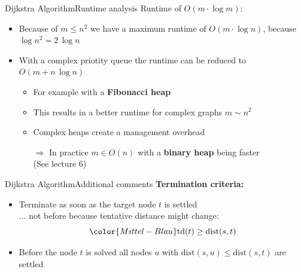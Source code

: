 \begin{frame}{Dijkstra Algorithm}{Runtime analysis}
  Runtime of {\color{Mittel-Blau}$O(m \cdot \log m)$}:
  \begin{itemize}
    \item
      Because of {\color{Mittel-Blau}$m \leq n^2$} we have a maximum runtime of
      {\color{Mittel-Blau}$O(m \cdot \log n)$}, because
      {\color{Mittel-Blau}$\log n^2 = 2 \, \log n$}
    \item
      With a complex {\color{Mittel-Blau}priotity queue} the runtime can be
      reduced to {\color{Mittel-Blau}$O(m + n \, \log n)$}
      \begin{itemize}
        \item
          For example with a \textbf{Fibonacci heap}
        \item
          This results in a better runtime for complex graphs
          {\color{Mittel-Blau}$m \sim n^2$}
        \item
          Complex heaps create a management overhead
        \item[$\Rightarrow$]
          In practice {\color{Mittel-Blau}$m \in O(n)$} with a
          \textbf{binary heap} being faster\\
          {\color{gray}(See lecture 6)}
      \end{itemize}
  \end{itemize}
\end{frame}


\begin{frame}{Dijkstra Algorithm}{Additional comments}
  \textbf{Termination criteria:}
  \begin{itemize}
    \item
      Terminate as soon as the target node {\color{Mittel-Blau}$t$} is settled\\
      $\ldots$ not before because tentative distance might change:
      \begin{displaymath}
        {\color{Mittel-Blau}\mathrm{td}(t) \geq \mathrm{dist}(s, t)}
      \end{displaymath}
    \item
      Before the node {\color{Mittel-Blau}$t$} is solved
      {\color{Mittel-Blau}all nodes $u$} with
      {\color{Mittel-Blau}$\mathrm{dist}(s, u) \leq \mathrm{dist}(s, t)$}
      are settled
  \end{itemize}
\end{frame}

